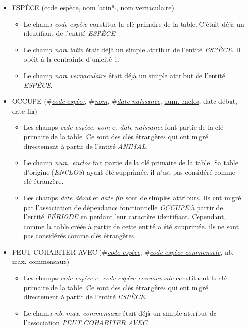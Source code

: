 \documentclass[a4paper]{article}
\newcommand{\relat}[1]{\textsc{#1}}
\newcommand{\attr}[1]{#1}
\newcommand{\prim}[1]{\uline{#1}}
\newcommand{\foreign}[1]{\#\textsl{#1}}
\begin{document}
\begin{itemize}
  \item \relat{ESPÈCE} (\prim{code espèce}, \attr{nom latin}$^{u_1}$, \attr{nom vernaculaire})
  \begin{itemize}
    \item Le champ \emph{code espèce} constitue la clé primaire de la table. C'était déjà un identifiant de l'entité \emph{ESPÈCE}.
    \item Le champ \emph{nom latin} était déjà un simple attribut de l'entité \emph{ESPÈCE}. Il obéit à la contrainte d'unicité 1.
    \item Le champ \emph{nom vernaculaire} était déjà un simple attribut de l'entité \emph{ESPÈCE}.
  \end{itemize}

  \item \relat{OCCUPE} (\foreign{\prim{code espèce}}, \foreign{\prim{nom}}, \foreign{\prim{date naissance}}, \prim{num. enclos}, \attr{date début}, \attr{date fin})
  \begin{itemize}
    \item Les champs \emph{code espèce}, \emph{nom} et \emph{date naissance} font partie de la clé primaire de la table. Ce sont des clés étrangères qui ont migré directement à partir de l'entité \emph{ANIMAL}.
    \item Le champ \emph{num. enclos} fait partie de la clé primaire de la table. Sa table d'origine (\emph{ENCLOS}) ayant été supprimée, il n'est pas considéré comme clé étrangère.
    \item Les champs \emph{date début} et \emph{date fin} sont de simples attributs. Ils ont migré par l'association de dépendance fonctionnelle \emph{OCCUPE} à partir de l'entité \emph{PÉRIODE} en perdant leur caractère identifiant. Cependant, comme la table créée à partir de cette entité a été supprimée, ils ne sont pas considérés comme clés étrangères.
  \end{itemize}

  \item \relat{PEUT COHABITER AVEC} (\foreign{\prim{code espèce}}, \foreign{\prim{code espèce commensale}}, \attr{nb. max. commensaux})
  \begin{itemize}
    \item Les champs \emph{code espèce} et \emph{code espèce commensale} constituent la clé primaire de la table. Ce sont des clés étrangères qui ont migré directement à partir de l'entité \emph{ESPÈCE}.
    \item Le champ \emph{nb. max. commensaux} était déjà un simple attribut de l'association \emph{PEUT COHABITER AVEC}.
  \end{itemize}


\end{itemize}
\end{document}
